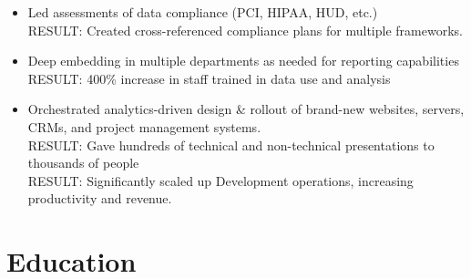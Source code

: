 \documentclass[]{deedy-resume-openfont}
\begin{document}
\begin{itemize}
        \item Led assessments of data compliance (PCI, HIPAA, HUD, etc.)
        \\ RESULT: Created cross-referenced compliance plans for multiple frameworks.
        \item Deep embedding in multiple departments as needed for reporting capabilities
        \\ RESULT: 400\% increase in staff trained in data use and analysis
        \item Orchestrated analytics-driven design \& rollout of brand-new websites, servers, CRMs, and project management systems.
        \\ RESULT: Gave hundreds of technical and non-technical presentations to thousands of people
        \\ RESULT: Significantly scaled up Development operations, increasing productivity and revenue.
    \end{itemize}

\iffalse

\section{Education}
    \sectionsep
    \sectionsep
\end{document}
